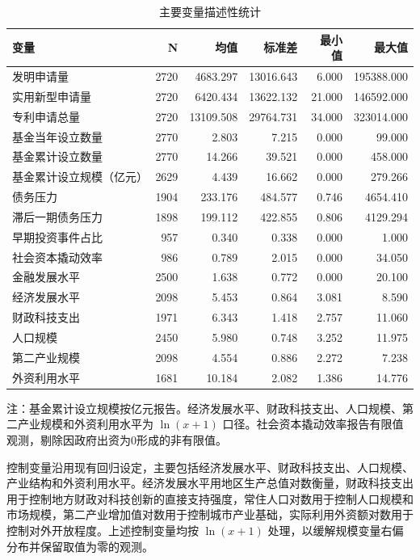 \begin{table}[htbp]
  \centering
  \caption{主要变量描述性统计}
  {\ERJTableFont
  \begin{tabular}{@{}L{4.2cm} r r r r r@{}}
    \toprule
    变量 & N & 均值 & 标准差 & 最小值 & 最大值 \\
    \midrule
    发明申请量 & 2720 & 4683.297 & 13016.643 & 6.000 & 195388.000 \\
    实用新型申请量 & 2720 & 6420.434 & 13622.132 & 21.000 & 146592.000 \\
    专利申请总量 & 2720 & 13109.508 & 29764.731 & 34.000 & 323014.000 \\
    基金当年设立数量 & 2770 & 2.803 & 7.215 & 0.000 & 99.000 \\
    基金累计设立数量 & 2770 & 14.266 & 39.521 & 0.000 & 458.000 \\
    基金累计设立规模（亿元） & 2629 & 4.439 & 16.662 & 0.000 & 279.266 \\
    债务压力 & 1904 & 233.176 & 484.577 & 0.746 & 4654.410 \\
    滞后一期债务压力 & 1898 & 199.112 & 422.855 & 0.806 & 4129.294 \\
    早期投资事件占比 & 957 & 0.340 & 0.338 & 0.000 & 1.000 \\
    社会资本撬动效率 & 986 & 0.789 & 2.015 & 0.000 & 34.050 \\
    金融发展水平 & 2500 & 1.638 & 0.772 & 0.000 & 20.100 \\
    经济发展水平 & 2098 & 5.453 & 0.864 & 3.081 & 8.590 \\
    财政科技支出 & 1971 & 6.343 & 1.418 & 2.757 & 11.060 \\
    人口规模 & 2450 & 5.980 & 0.748 & 3.252 & 11.975 \\
    第二产业规模 & 2098 & 4.554 & 0.886 & 2.272 & 7.238 \\
    外资利用水平 & 1681 & 10.184 & 2.082 & 1.386 & 14.776 \\
    \bottomrule
  \end{tabular}

  \par\smallskip
  {\ERJTableNoteFont 注：基金累计设立规模按亿元报告。经济发展水平、财政科技支出、人口规模、第二产业规模和外资利用水平为 $\ln(x+1)$ 口径。社会资本撬动效率报告有限值观测，剔除因政府出资为0形成的非有限值。}
  }
\end{table}

控制变量沿用现有回归设定，主要包括经济发展水平、财政科技支出、人口规模、产业结构和外资利用水平。经济发展水平用地区生产总值对数衡量，财政科技支出用于控制地方财政对科技创新的直接支持强度，常住人口对数用于控制人口规模和市场规模，第二产业增加值对数用于控制城市产业基础，实际利用外资额对数用于控制对外开放程度。上述控制变量均按 $\ln(x+1)$ 处理，以缓解规模变量右偏分布并保留取值为零的观测。

